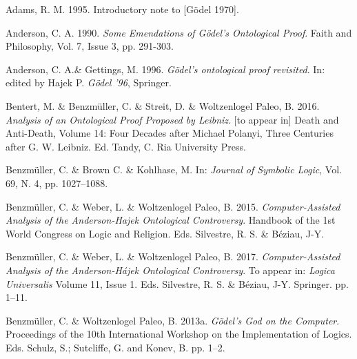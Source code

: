 \documentclass[smallextended]{svjour3}
\begin{document}
\begin{thebibliography}{9}

Adams, R. M. 1995. Introductory note to [G\"odel 1970]. 

Anderson, C. A. 1990. {\itshape Some Emendations of G\"odel's Ontological Proof}. Faith and Philosophy, Vol. 7, Issue 3, pp. 291-303. 

Anderson, C. A.\& Gettings, M. 1996.  {\itshape G\"odel's ontological proof revisited}. In: edited by Hajek P. {\itshape G\"odel '96},  Springer. 

Bentert, M. \& Benzm\"uller, C. \& Streit, D. \& Woltzenlogel Paleo, B. 2016. {\itshape Analysis of an Ontological Proof Proposed by Leibniz}. [to appear in]  Death and Anti-Death, Volume 14: Four Decades after Michael Polanyi, Three Centuries after G. W. Leibniz. Ed. Tandy, C. Ria University Press. 

Benzm\"uller, C. \& Brown C. \& Kohlhase, M. In: {\itshape Journal of Symbolic Logic}, Vol. 69, N. 4, pp. 1027--1088.

Benzm\"uller, C. \& Weber, L. \& Woltzenlogel Paleo, B. 2015. {\itshape Computer-Assisted Analysis of the Anderson-Hajek Ontological Controversy}. Handbook of the 1st World Congress on Logic and Religion. Eds. Silvestre, R. S. \& B\'{e}ziau, J-Y. 

Benzm\"uller, C. \& Weber, L. \& Woltzenlogel Paleo, B. 2017. {\itshape Computer-Assisted Analysis of the Anderson-H\'ajek Ontological Controversy}. To appear in: {\itshape Logica Universalis} Volume 11, Issue 1. Eds. Silvestre, R. S. \& B\'{e}ziau, J-Y. Springer. pp. 1--11.


Benzm\"uller, C. \& Woltzenlogel Paleo, B. 2013a. {\itshape G{\"{o}}del's God on the Computer}. Proceedings of the 10th International Workshop on the Implementation of Logics. Eds. Schulz, S.; Sutcliffe, G. and Konev, B. pp. 1--2.


\end{thebibliography}
\end{document}
